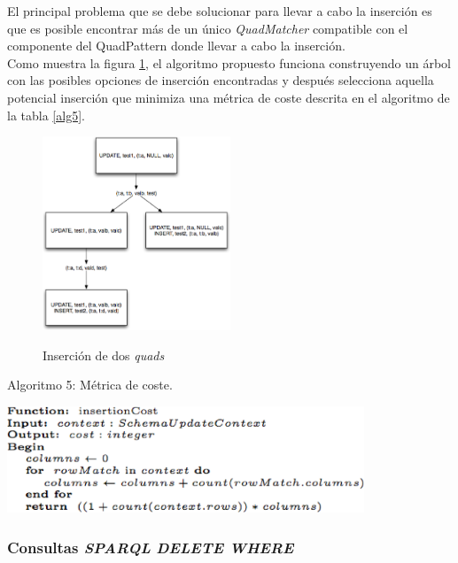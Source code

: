 El principal problema que se debe solucionar para llevar a cabo la inserci\'on es que es posible encontrar m\'as de un \'unico \textit{QuadMatcher} compatible con el componente del QuadPattern donde llevar a cabo la inserci\'on.\\
Como muestra la figura \ref{figura3}, el algoritmo propuesto funciona construyendo un \'arbol con las posibles opciones de inserci\'on encontradas y despu\'es selecciona aquella potencial inserci\'on que minimiza una m\'etrica de coste descrita en el algoritmo de la tabla \ref{alg5}.

\begin{figure}
\vspace{2.4in}
\caption{Inserci\'on de dos \textit{quads}}
\vspace{5mm}
\includegraphics[width=0.5\textwidth]{figura3}
\label{figura3}
\end{figure}

\begin{table}
\vspace{2.4in}
\caption{Algoritmo 5: M\'etrica de coste.}
\vspace{5mm}
\includegraphics[width=0.8\textwidth]{algoritmo5}
\label{alg5}
\end{table}


\subsubsection{Consultas \textit{SPARQL} \textit{DELETE WHERE}}

